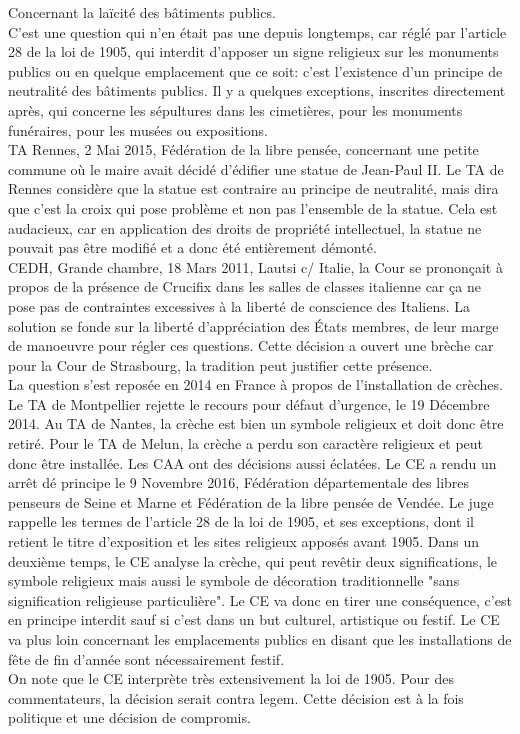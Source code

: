 \documentclass[10pt, a4paper, openany]{book}
\begin{document}
Concernant la laïcité des bâtiments publics. \\
C'est une question qui n'en était pas une depuis longtemps, car réglé par l'article 28 de la loi de 1905, qui interdit d'apposer un signe religieux sur les monuments publics ou en quelque emplacement que ce soit: c'est l'existence d'un principe de neutralité des bâtiments publics. Il y a quelques exceptions, inscrites directement après, qui concerne les sépultures dans les cimetières, pour les monuments funéraires, pour les musées ou expositions. \\
TA Rennes, 2 Mai 2015, Fédération de la libre pensée, concernant une petite commune où le maire avait décidé d'édifier une statue de Jean-Paul II. Le TA de Rennes considère que la statue est contraire au principe de neutralité, mais dira que c'est la croix qui pose problème et non pas l'ensemble de la statue. Cela est audacieux, car en application des droits de propriété intellectuel, la statue ne pouvait pas être modifié et a donc été entièrement démonté. \\
CEDH, Grande chambre, 18 Mars 2011, Lautsi c/ Italie, la Cour se prononçait à propos de la présence de Crucifix dans les salles de classes italienne car ça ne pose pas de contraintes excessives à la liberté de conscience des Italiens. La solution se fonde sur la liberté d'appréciation des États membres, de leur marge de manoeuvre pour régler ces questions. Cette décision a ouvert une brèche car pour la Cour de Strasbourg, la tradition peut justifier cette présence. \\
La question s'est reposée en 2014 en France à propos de l'installation de crèches. Le TA de Montpellier rejette le recours pour défaut d'urgence, le 19 Décembre 2014. Au TA de Nantes, la crèche est bien un symbole religieux et doit donc être retiré. Pour le TA de Melun, la crèche a perdu son caractère religieux et peut donc être installée. Les CAA ont des décisions aussi éclatées. Le CE a rendu un arrêt dé principe le 9 Novembre 2016, Fédération départementale des libres penseurs de Seine et Marne et Fédération de la libre pensée de Vendée. Le juge rappelle les termes de l'article 28 de la loi de 1905, et ses exceptions, dont il retient le titre d'exposition et les sites religieux apposés avant 1905. Dans un deuxième temps, le CE analyse la crèche, qui peut revêtir deux significations, le symbole religieux mais aussi le symbole de décoration traditionnelle "sans signification religieuse  particulière". Le CE va donc en tirer une conséquence, c'est en principe interdit sauf si c'est dans un but culturel, artistique ou festif. Le CE va plus loin concernant les emplacements publics en disant que les installations de fête de fin d'année sont nécessairement festif. \\
On note que le CE interprète très extensivement la loi de 1905. Pour des commentateurs, la décision serait contra legem. Cette décision est à la fois politique et une décision de compromis. 
\end{document}
